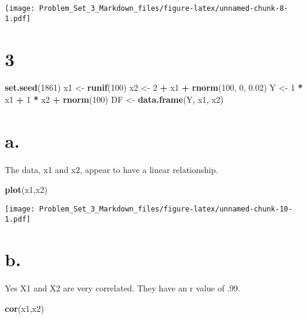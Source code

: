 \documentclass[]{article}
\newenvironment{Shaded}{\begin{snugshade}}{\end{snugshade}}
\newcommand{\KeywordTok}[1]{\textcolor[rgb]{0.13,0.29,0.53}{\textbf{#1}}}
\newcommand{\DecValTok}[1]{\textcolor[rgb]{0.00,0.00,0.81}{#1}}
\newcommand{\FloatTok}[1]{\textcolor[rgb]{0.00,0.00,0.81}{#1}}
\newcommand{\StringTok}[1]{\textcolor[rgb]{0.31,0.60,0.02}{#1}}
\newcommand{\OperatorTok}[1]{\textcolor[rgb]{0.81,0.36,0.00}{\textbf{#1}}}
\newcommand{\NormalTok}[1]{#1}
\begin{document}
\texttt{[image: Problem\_Set\_3\_Markdown\_files/figure-latex/unnamed-chunk-8-1.pdf]}

\section{3}\label{section-2}

\begin{Shaded}
\begin{Highlighting}[]
\KeywordTok{set.seed}\NormalTok{(}\DecValTok{1861}\NormalTok{)}
\NormalTok{x1 <-}\StringTok{ }\KeywordTok{runif}\NormalTok{(}\DecValTok{100}\NormalTok{)}
\NormalTok{x2 <-}\StringTok{ }\DecValTok{2} \OperatorTok{+}\StringTok{ }\NormalTok{x1 }\OperatorTok{+}\StringTok{ }\KeywordTok{rnorm}\NormalTok{(}\DecValTok{100}\NormalTok{, }\DecValTok{0}\NormalTok{, }\FloatTok{0.02}\NormalTok{)}
\NormalTok{Y <-}\StringTok{ }\DecValTok{1} \OperatorTok{*}\StringTok{ }\NormalTok{x1 }\OperatorTok{+}\StringTok{ }\DecValTok{1} \OperatorTok{*}\StringTok{ }\NormalTok{x2 }\OperatorTok{+}\StringTok{ }\KeywordTok{rnorm}\NormalTok{(}\DecValTok{100}\NormalTok{)}
\NormalTok{DF <-}\StringTok{ }\KeywordTok{data.frame}\NormalTok{(Y, x1, x2)}
\end{Highlighting}
\end{Shaded}

\section{a.}\label{a.-2}

The data, x1 and x2, appear to have a linear relationship.

\begin{Shaded}
\begin{Highlighting}[]
\KeywordTok{plot}\NormalTok{(x1,x2)}
\end{Highlighting}
\end{Shaded}

\texttt{[image: Problem\_Set\_3\_Markdown\_files/figure-latex/unnamed-chunk-10-1.pdf]}

\section{b.}\label{b.-2}

Yes X1 and X2 are very correlated. They have an r value of .99.

\begin{Shaded}
\begin{Highlighting}[]
\KeywordTok{cor}\NormalTok{(x1,x2)}
\end{Highlighting}
\end{Shaded}
\end{document}
